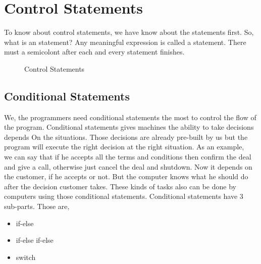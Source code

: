\documentclass[openany]{book}  %
\begin{document}
% 
%
\chapter{Control Statements}
To know about control statements, we have know about the statements first. So, \\
what is an statement? Any meaningful expression is called a statement. There \\
must a semicolont after each and every statement finishes.
% 
% 
\begin{figure}[htbp]
    \begin{center}
        \caption{Control Statements\cite{Ref3}}
    \end{center}
\end{figure}
% 
%
\section{Conditional Statements}
We, the programmers need conditional statements the most to control the flow of \\
the program. Conditional statements gives machines the ability to take decisions
depends On the situations. Those decisions are already pre-built by us but the \\
program will execute the right decision at the right situation. As an example, \\
we can say that if he accepts all the terms and conditions then confirm the deal
and give a call, otherwise just cancel the deal and shutdown. Now it depends on
the customer, if he accepts or not. But the computer knows what he should do \\
after the decision customer takes. These kinds of tasks also can be done by \\
computers using those conditional statements. Conditional statements have 3 \\
sub-parts. Those are,
\begin{itemize}
    \item if-else
    \item if-else if-else
    \item switch
\end{itemize}
% 
% 
\end{document}
